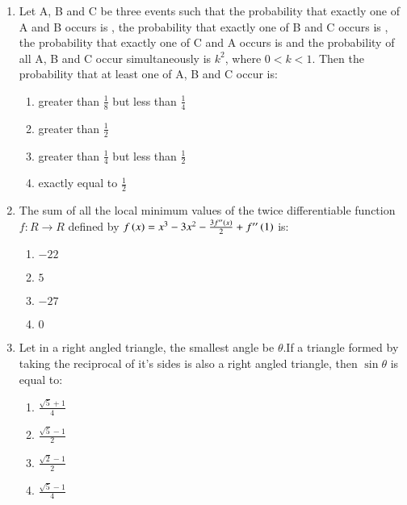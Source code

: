 \documentclass[journal,9pt,onecolumn]{IEEEtran}
\begin{document}
\begin{enumerate}
    \item Let A, B and C be three events such that the probability that exactly one of A and B occurs is , the probability that exactly one of B and C occurs is , the probability that exactly one of C and A occurs is  and the probability of all A, B and C occur simultaneously is $k^2$, where $0<k<1$. Then the probability that at least one of A, B and C occur is:

        \begin{multicols}{2}
            \begin{enumerate}
                \item greater than $\frac{1}{8}$ but less than $\frac{1}{4}$
                \item greater than $\frac{1}{2}$
                \item greater than $\frac{1}{4}$ but less than $\frac{1}{2}$
                \item exactly equal to $\frac{1}{2}$
            \end{enumerate}
        \end{multicols}

    \item The sum of all the local minimum values of the twice differentiable function $f:R\rightarrow R$ defined by $f\left(x\right)=x^3-3x^2-\frac{3f''\left(x\right)}{2}+f''\left(1\right)$ is:

        \begin{multicols}{4}
            \begin{enumerate}
                \item $-22$
                \item $5$
                \item $-27$
                \item $0$
            \end{enumerate}
        \end{multicols}

    \item Let in a right angled triangle, the smallest angle be $\theta$.If a triangle formed by taking the reciprocal of it's sides is also a right angled triangle, then $\sin \theta$ is equal to:

        \begin{multicols}{4}
            \begin{enumerate}
                \item $\frac{\sqrt{5}+1}{4}$
                \item $\frac{\sqrt{5}-1}{2}$
                \item $\frac{\sqrt{2}-1}{2}$
                \item $\frac{\sqrt{5}-1}{4}$
            \end{enumerate}
        \end{multicols}


\end{enumerate}
\end{document}
